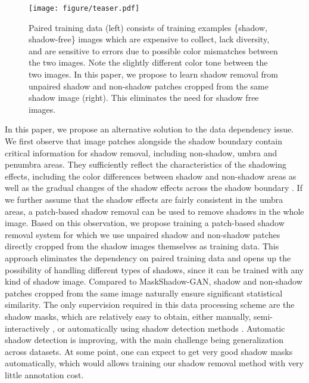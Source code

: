 \documentclass[runningheads]{llncs}
\begin{document}
\begin{figure}[t!]
	\centering
  \texttt{[image: figure/teaser.pdf]}

  \caption{Paired training data (left) consists of training examples \{shadow, shadow-free\} images which are expensive to collect, lack diversity, and are sensitive to errors due to possible color mismatches between the two images. Note the slightly different color tone between the two images. In this paper, we propose to learn shadow removal from unpaired shadow  and non-shadow patches cropped from the same shadow image (right). This eliminates the need for shadow free images. }
  \label{fig:Teaser}
\end{figure}
In this paper, we propose an alternative solution to the data dependency issue. We first observe that image patches alongside the shadow boundary contain critical information for shadow removal, including non-shadow, umbra and penumbra areas. They sufficiently reflect the characteristics of the shadowing effects, including the color differences between shadow and non-shadow areas as well as the gradual changes of the shadow effects across the shadow boundary \cite{Panagopoulospami13,panagopoulos2010estimating,guoPami}. If we further assume that the shadow effects are fairly consistent in the umbra areas, a patch-based shadow removal can be used to remove shadows in the whole image. Based on this observation, we propose training a patch-based shadow removal system for which we use unpaired shadow and non-shadow patches directly cropped from the shadow images themselves as training data. This approach eliminates the dependency on paired training data and opens up the possibility of handling different types of shadows, since it can be trained with any kind of shadow image. Compared to MaskShadow-GAN, shadow and non-shadow patches cropped from the same image naturally ensure significant statistical similarity. The only supervision required in this data processing scheme are the shadow masks, which are relatively easy to obtain, either manually, semi-interactively \cite{Vicente-etal-ECCV16,Gong16}, or automatically using shadow detection methods \cite{Ding2019ARGANAR,zhu18b,Zheng2019DistractionAwareSD,m_Le-etal-ECCV18}.
Automatic shadow detection is improving, with the main challenge being generalization across datasets. At some point, one can expect to get very good shadow masks automatically, which would allows training our shadow removal method with very little annotation cost.
\end{document}
